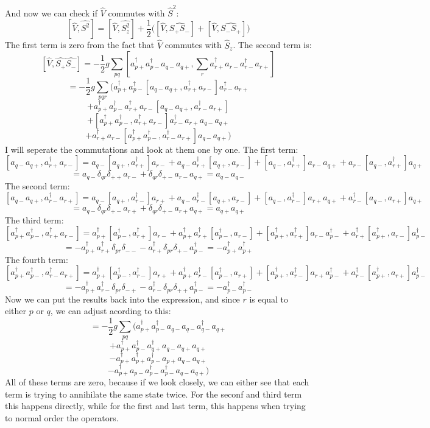 \documentclass[a4paper,12pt]{article}
\begin{document}
And now we can check if $\hat{ V}$ commutes with $\hat{ S}^2$:
$$[\hat{V},\hat{S^2}] = [\hat{ V}, \hat{S_z^2}] + \frac{1}{2} \Big( [\hat{V}, \hat{S_+S_-}] + [\hat{V}, \hat{S_-S_+}] \Big)$$
The first term is zero from the fact that $\hat{ V}$ commutes with $\hat{ S}_z$. The second term is:
$$ [\hat{V},\hat{S_+}\hat{S_-}] = - \frac{1}{2}g ∑_{pq}^{} [a_{p+}^{†}a_{p-}^{†} a_{q-} a_{q+}, ∑_{r}^{} a_{r+}^{†}a_{r-}a_{r-}^{†} a_{r+} ]$$
$$ = - \frac{1}{2}g ∑_{pqr}^{} \Big( a_{p+}^{†} a_{p-}^{†} [a_{q-}a_{q+},a_{r+}^{†}a_{r-}]a_{r-}^{†}a_{r+} 
$$
$$
+ a_{p+}^{†}a_{p-}^{†}a_{r+}^{†}a_{r-}[a_{q-}a_{q+},a_{r-}^{†}a_{r+}]
$$
$$
+ [a_{p+}^{†}a_{p-}^{†},a_{r+}^{†}a_{r-}]a_{r-}^{†}a_{r+}a_{q-}a_{q+}
$$
$$
+ a_{r+}^{†}a_{r-}[a_{p+}^{†}a_{p-}^{†},a_{r-}^{†}a_{r+}]a_{q-}a_{q+}
\Big)$$
I will seperate the commutations and look at them one by one. The first term:
$$[a_{q-}a_{q+},a_{r+}^{†}a_{r-}] 
= a_{q-}[a_{q+},a_{r+}^{†}]a_{r-} + a_{q-}a_{r+}^{†}[a_{q+},a_{r-}]
+ [a_{q-},a_{r+}^{†}]a_{r-}a_{q+} + a_{r-}[a_{q-},a_{r+}^{†}]a_{q+}$$
$$
= a_{q-}δ_{qr}δ_{++}a_{r-} + δ_{qr}δ_{+-}a_{r-}a_{q+} =a_{q-}a_{q-}   
$$
The second term:
$$[a_{q-}a_{q+},a_{r-}^{†}a_{r+}]
= a_{q-}[a_{q+},a_{r-}^{†}]a_{r+} + a_{q-}a_{r-}^{†}[a_{q+},a_{r-}]
+ [a_{q-},a_{r-}^{†}]a_{r+}a_{q+} + a_{r-}^{†}[a_{q-},a_{r+}]a_{q+}$$
$$
= a_{q-}δ_{qr}δ_{+-}a_{r+} + δ_{qr}δ_{+-}a_{r+}a_{q+} =a_{q+}a_{q+}
$$
The third term:
$$[a_{p+}^{†}a_{p-}^{†},a_{r+}^{†}a_{r-}]
= a_{p+}^{†}[a_{p-}^{†},a_{r+}^{†}]a_{r-} + a_{p+}^{†}a_{r+}^{†}[a_{p-}^{†},a_{r-}]
+ [a_{p+}^{†},a_{r+}^{†}]a_{r-}a_{p-}^{†} + a_{r+}^{†}[a_{p+}^{†},a_{r-}]a_{p-}^{†}$$
$$
= -a_{p+}^{†}a_{r+}^{†}δ_{pr}δ_{- -} - a_{r+}^{†}δ_{pr}δ_{+-}a_{p-}^{†} = -a_{p+}^{†}a_{p+}^{†}
$$
The fourth term:
$$[a_{p+}^{†}a_{p-}^{†},a_{r-}^{†}a_{r+}]
= a_{p+}^{†}[a_{p-}^{†},a_{r-}^{†}]a_{r+} + a_{p+}^{†}a_{r-}^{†}[a_{p-}^{†},a_{r+}]
+ [a_{p+}^{†},a_{r-}^{†}]a_{r+}a_{p-}^{†} + a_{r-}^{†}[a_{p+}^{†},a_{r+}]a_{p-}^{†}$$
$$
= -a_{p+}^{†}a_{r-}^{†}δ_{pr}δ_{- +} - a_{r-}^{†}δ_{pr}δ_{+ +}a_{p-}^{†} = -a_{p-}^{†}a_{p-}^{†}
$$
Now we can put the results back into the expression, and since $r$ is equal to either $p$ or $q$, we can adjust acording to this:
$$ = - \frac{1}{2}g ∑_{pq}^{} \Big( a_{p+}^{†} a_{p-}^{†} a_{q-}a_{q-}  a_{q-}^{†}a_{q+} 
$$
$$
+ a_{p+}^{†}a_{p-}^{†}a_{q+}^{†}a_{q-}a_{q+}a_{q+}
$$
$$
-a_{p+}^{†}a_{p+}^{†}a_{p-}^{†}a_{p+}a_{q-}a_{q+}
$$
$$
- a_{p+}^{†}a_{p-}a_{p-}^{†}a_{p-}^{†}a_{q-}a_{q+}
\Big)$$
All of these terms are zero, because if we look closely, we can either see that each term is trying to annihilate the same state twice. For the seconf and third term this happens directly, while for the first and last term, this happens when trying to normal order the operators.\\
\end{document}
